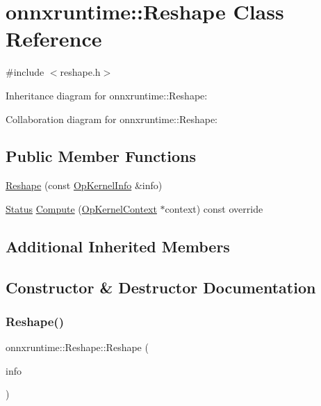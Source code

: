 \hypertarget{classonnxruntime_1_1Reshape}{}\section{onnxruntime\+:\+:Reshape Class Reference}
\label{classonnxruntime_1_1Reshape}


{\ttfamily \#include $<$reshape.\+h$>$}



Inheritance diagram for onnxruntime\+:\+:Reshape\+:


Collaboration diagram for onnxruntime\+:\+:Reshape\+:
\subsection*{Public Member Functions}
\begin{DoxyCompactItemize}
\item 
\mbox{\hyperlink{classonnxruntime_1_1Reshape_abbf883e5f0e034c8e0c8e18e7ef3cb15}{Reshape}} (const \mbox{\hyperlink{classonnxruntime_1_1OpKernelInfo}{Op\+Kernel\+Info}} \&info)
\item 
\mbox{\hyperlink{classonnxruntime_1_1common_1_1Status}{Status}} \mbox{\hyperlink{classonnxruntime_1_1Reshape_ace7322da25a10e2e9ae86d03d9870bb1}{Compute}} (\mbox{\hyperlink{classonnxruntime_1_1OpKernelContext}{Op\+Kernel\+Context}} $\ast$context) const override
\end{DoxyCompactItemize}
\subsection*{Additional Inherited Members}


\subsection{Constructor \& Destructor Documentation}
\mbox{\label{classonnxruntime_1_1Reshape_abbf883e5f0e034c8e0c8e18e7ef3cb15}} 
\subsubsection{\texorpdfstring{Reshape()}{Reshape()}}
{\footnotesize\ttfamily onnxruntime\+::\+Reshape\+::\+Reshape (\begin{DoxyParamCaption}\item[{const \mbox{\hyperlink{classonnxruntime_1_1OpKernelInfo}{Op\+Kernel\+Info}} \&}]{info }\end{DoxyParamCaption})\hspace{0.3cm}{\ttfamily [inline]}}



